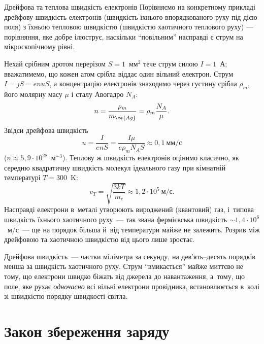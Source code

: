 \begin{Example}{Дрейфова та теплова швидкість електронів}
Порівняємо на конкретному прикладі дрейфову швидкість електронів (швидкість їхнього впорядкованого руху під дією поля) з їхньою тепловою швидкістю
(швидкістю хаотичного теплового руху) --- порівняння, яке добре ілюструє, наскільки \enquote{повільним} насправді є струм на мікроскопічному рівні.

Нехай срібним дротом перерізом $S=1$~мм$^2$ тече струм силою $I=1$~А; вважатимемо, що кожен атом срібла віддає один вільний електрон. Струм
$I = jS = enuS$, а концентрацію електронів знаходимо через густину срібла $\rho_m$, його молярну масу $\mu$ і сталу Авогадро $N_A$:
\begin{equation*}
	n = \frac{\rho_m}{m_{\ce{Ag}}} = \rho_m\frac{N_A}{\mu}.
\end{equation*}
Звідси дрейфова швидкість
\begin{equation*}
	u = \frac{I}{enS} = \frac{I\mu}{e\rho_m N_A S} \approx 0{,}1\ \text{мм/с}
\end{equation*}
($n \approx 5{,}9\cdot10^{28}$~м$^{-3}$). Теплову ж швидкість електронів оцінимо класично, як середню квадратичну швидкість молекул ідеального
газу при кімнатній температурі $T=300$~K:
\begin{equation*}
	v_T = \sqrt{\frac{3kT}{m_e}} \approx 1{,}2\cdot 10^5\ \text{м/с}.
\end{equation*}
Насправді електрони в~металі утворюють вироджений (квантовий) газ, і~типова швидкість їхнього хаотичного руху~--- так звана
фермієвська швидкість $\sim1{,}4\cdot10^6$~м/с~--- ще на порядок більша й~від температури майже не залежить. Розрив між
дрейфовою та хаотичною швидкістю від цього лише зростає.
\end{Example}

\begin{Attention}
	Дрейфова швидкість~--- частки міліметра за секунду, на дев'ять--десять порядків менша
	за швидкість хаотичного руху. Струм \enquote{вмикається} майже миттєво не тому, що
	електрони швидко біжать від джерела до навантаження, а~тому, що поле, яке рухає
	\emph{одночасно} всі вільні електрони провідника, встановлюється в~колі зі швидкістю
	порядку швидкості світла.
\end{Attention}

\section{Закон збереження заряду}\hypertarget{charge-conservation-law}{}

